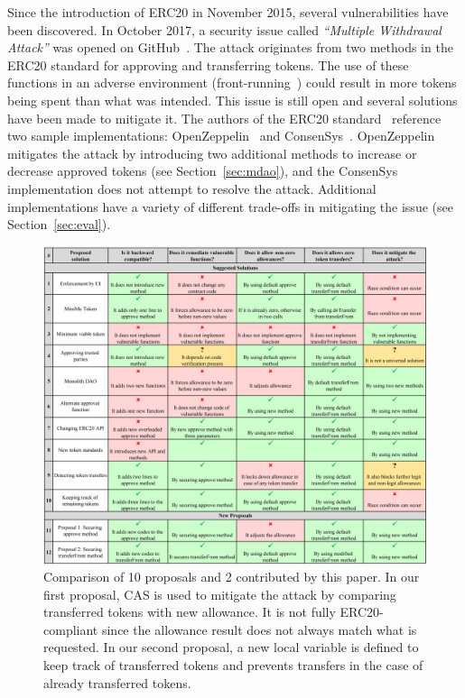 Since the introduction of ERC20 in November 2015, several vulnerabilities have been discovered. In October 2017, a security issue called \textit{``Multiple Withdrawal Attack''} was opened on GitHub~\cite{Ref13,Ref07}. The attack originates from two methods in the ERC20 standard for approving and transferring tokens. The use of these functions in an adverse environment (\eg front-running~\cite{eskandari2019sok}) could result in more tokens being spent than what was intended. This issue is still open and several solutions have been made to mitigate it. The authors of the ERC20 standard~\cite{Ref08} reference two sample implementations: OpenZeppelin~\cite{Ref10} and ConsenSys~\cite{Ref11}. OpenZeppelin mitigates the attack by introducing two additional methods to increase or decrease approved tokens (see Section~\ref{sec:mdao}), and the ConsenSys implementation does not attempt to resolve the attack. Additional implementations have a variety of different trade-offs in mitigating the issue (see Section~\ref{sec:eval}).

\begin{figure}[t]
\includegraphics[width=\textwidth]{figures/multiple_withdrawal_04_wide.png}
\caption{Comparison of 10 proposals and 2 contributed by this paper. In our first proposal, CAS is used to mitigate the attack by comparing transferred tokens with new allowance. It is not fully ERC20-compliant since the allowance result does not always match what is requested. In our second proposal, a new local variable is defined to keep track of transferred tokens and prevents transfers in the case of already transferred tokens.\label{tab:comp}}
\end{figure}


